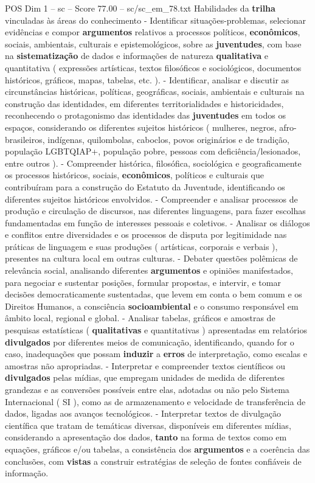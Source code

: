 \begin{textsample}{POS Dim 1 – sc – Score 77.00 – sc/sc\_em\_78.txt}
Habilidades da \textbf{trilha} vinculadas às áreas do conhecimento - Identificar situações-problemas, selecionar evidências e compor \textbf{argumentos} relativos a processos políticos, \textbf{econômicos}, sociais, ambientais, culturais e epistemológicos, sobre as \textbf{juventudes}, com base na \textbf{sistematização} de dados e informações de natureza \textbf{qualitativa} e quantitativa ( expressões artísticas, textos filosóficos e sociológicos, documentos históricos, gráficos, mapas, tabelas, etc. ). - Identificar, analisar e discutir as circunstâncias históricas, políticas, geográficas, sociais, ambientais e culturais na construção das identidades, em diferentes territorialidades e historicidades, reconhecendo o protagonismo das identidades das \textbf{juventudes} em todos os espaços, considerando os diferentes sujeitos históricos ( mulheres, negros, afro-brasileiros, indígenas, quilombolas, caboclos, povos originários e de tradição, população LGBTQIAP+, população pobre, pessoas com deficiência/lesionados, entre outros ). - Compreender histórica, filosófica, sociológica e geograficamente os processos históricos, sociais, \textbf{econômicos}, políticos e culturais que contribuíram para a construção do Estatuto da Juventude, identificando os diferentes sujeitos históricos envolvidos. - Compreender e analisar processos de produção e circulação de discursos, nas diferentes linguagens, para fazer escolhas fundamentadas em função de interesses pessoais e coletivos. - Analisar os diálogos e conflitos entre diversidades e os processos de disputa por legitimidade nas práticas de linguagem e suas produções ( artísticas, corporais e verbais ), presentes na cultura local em outras culturas. - Debater questões polêmicas de relevância social, analisando diferentes \textbf{argumentos} e opiniões manifestados, para negociar e sustentar posições, formular propostas, e intervir, e tomar decisões democraticamente sustentadas, que levem em conta o bem comum e os Direitos Humanos, a consciência \textbf{socioambiental} e o consumo responsável em âmbito local, regional e global. - Analisar tabelas, gráficos e amostras de pesquisas estatísticas ( \textbf{qualitativas} e quantitativas ) apresentadas em relatórios \textbf{divulgados} por diferentes meios de comunicação, identificando, quando for o caso, inadequações que possam \textbf{induzir} a \textbf{erros} de interpretação, como escalas e amostras não apropriadas. - Interpretar e compreender textos científicos ou \textbf{divulgados} pelas mídias, que empregam unidades de medida de diferentes grandezas e as conversões possíveis entre elas, adotadas ou não pelo Sistema Internacional ( SI ), como as de armazenamento e velocidade de transferência de dados, ligadas aos avanços tecnológicos. - Interpretar textos de divulgação científica que tratam de temáticas diversas, disponíveis em diferentes mídias, considerando a apresentação dos dados, \textbf{tanto} na forma de textos como em equações, gráficos e/ou tabelas, a consistência dos \textbf{argumentos} e a coerência das conclusões, com \textbf{vistas} a construir estratégias de seleção de fontes confiáveis de informação.

\end{textsample}
